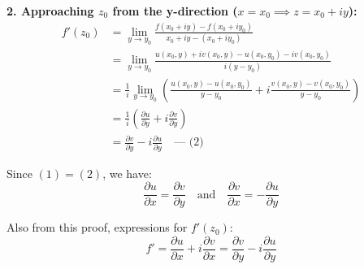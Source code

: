 \textbf{2. Approaching $z_{0}$ from the y-direction ($x = x_0 \implies z = x_{0} + iy$):}
\begin{align*}
f'(z_{0}) &= \lim_{y \rightarrow y_{0}} \frac{f(x_{0} + iy) - f(x_{0} + iy_{0})}{x_{0} + iy - (x_{0} + iy_{0})} \\
&= \lim_{y \rightarrow y_{0}} \frac{u(x_{0}, y) + iv(x_{0}, y) - u(x_{0}, y_{0}) - iv(x_{0}, y_{0})}{i(y - y_{0})} \\
&= \frac{1}{i} \lim_{y \rightarrow y_{0}} \left( \frac{u(x_{0}, y) - u(x_{0}, y_{0})}{y - y_{0}} + i \frac{v(x_{0}, y) - v(x_{0}, y_{0})}{y - y_{0}} \right) \\
&= \frac{1}{i} \left( \frac{\partial u}{\partial y} + i \frac{\partial v}{\partial y} \right) \\
&= \frac{\partial v}{\partial y} - i \frac{\partial u}{\partial y} \quad \text{--- (2)}
\end{align*}

Since $(1) = (2)$, we have:
$$ \frac{\partial u}{\partial x} = \frac{\partial v}{\partial y} \quad \text{and} \quad \frac{\partial v}{\partial x} = -\frac{\partial u}{\partial y} $$

Also from this proof, expressions for $f'(z_{0})$:
$$ f' = \frac{\partial u}{\partial x} + i\frac{\partial v}{\partial x} = \frac{\partial v}{\partial y} - i\frac{\partial u}{\partial y} $$

